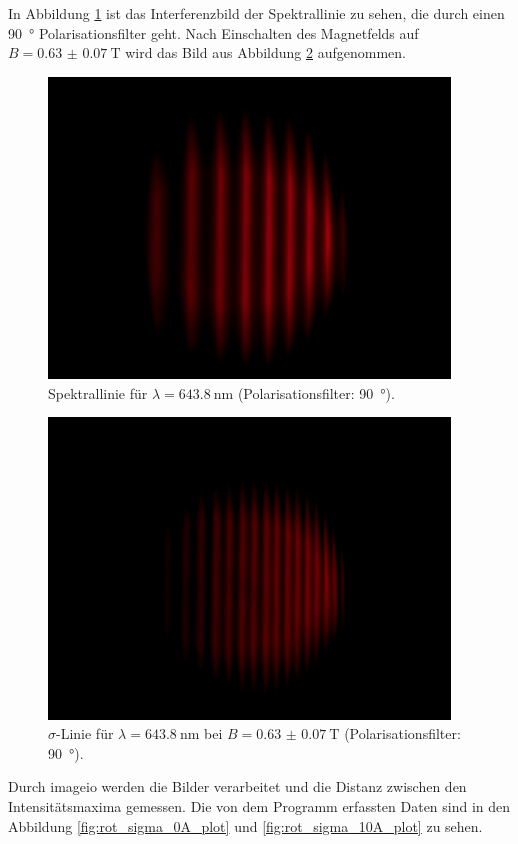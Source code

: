 In Abbildung \ref{fig:rot_sigma_0A} ist das Interferenzbild der Spektrallinie zu sehen, die durch einen \SI{90}{\degree} Polarisationsfilter geht.
Nach Einschalten des Magnetfelds auf $B=\SI{0.63(7)}{\tesla}$ wird das Bild aus Abbildung \ref{fig:rot_sigma_10A} aufgenommen.
\begin{figure}[htb]
  \centering
  \includegraphics[height=8cm]{content/pictures/rot_sigma_0A.png}
  \caption{Spektrallinie für $\lambda=\SI{643.8}{\nano\meter}$ (Polarisationsfilter: \SI{90}{\degree}).}
  \label{fig:rot_sigma_0A}
\end{figure}
\begin{figure}[htb]
  \centering
  \includegraphics[height=8cm]{content/pictures/rot_sigma_10A.png}
  \caption{$\sigma$-Linie für $\lambda=\SI{643.8}{\nano\meter}$ bei $B=\SI{0.63(7)}{\tesla}$ (Polarisationsfilter: \SI{90}{\degree}).}
  \label{fig:rot_sigma_10A}
\end{figure}
Durch imageio \cite{imageio} werden die Bilder verarbeitet und die Distanz zwischen den Intensitätsmaxima gemessen.
Die von dem Programm erfassten Daten sind in den Abbildung \ref{fig:rot_sigma_0A_plot} und \ref{fig:rot_sigma_10A_plot} zu sehen.

